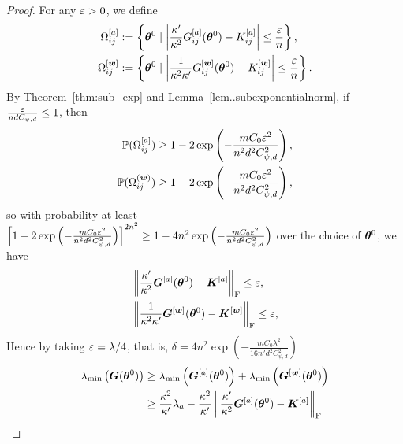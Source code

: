\documentclass[twoside,11pt]{article}
\begin{document}
\begin{proof}
    For any $\varepsilon > 0$, we define
    \begin{equation*}
        \begin{aligned}
            \Omega_{ij}^{[a]}   & :=\left\{\bm{\theta}^0 \mid \left\lvert \frac{\kappa'}{\kappa^2}G^{[a]}_{ij}(\bm{\theta}^0) - K^{[a]}_{ij}\right\rvert \leq \frac{\varepsilon}{n} \right\},       \\
            \Omega_{ij}^{[\bm{w}]} & := \left\{\bm{\theta}^0 \mid \left\lvert \frac{1}{\kappa^2\kappa'}G^{[\bm{w}]}_{ij}(\bm{\theta}^0) - K^{[\bm{w}]}_{ij}\right\rvert \leq \frac{\varepsilon}{n} \right\}.
        \end{aligned}
    \end{equation*}
    By Theorem~\ref{thm:sub_exp} and Lemma~\ref{lem..subexponentialnorm}, if $\frac{\varepsilon}{ndC_{\psi,d}}\leq 1$, then
    \begin{equation*}
        \begin{aligned}
            \mathbb{P}(\Omega^{[a]}_{ij})   & \geq 1-2\exp\left(-\frac{mC_0\varepsilon^2}{n^2d^2C_{\psi,d}^2}\right), \\
            \mathbb{P}(\Omega^{(\bm{w})}_{ij}) & \geq 1-2\exp\left(-\frac{mC_0\varepsilon^2}{n^2d^2C_{\psi,d}^2}\right),
        \end{aligned}
    \end{equation*}
    so with probability at least $\left[1-2\exp\left(-\frac{mC_0\varepsilon^2}{n^2d^2C_{\psi,d}^2}\right)\right]^{2n^2} \geq 1-4n^2\exp\left(-\frac{mC_0\varepsilon^2}{n^2d^2C_{\psi,d}^2}\right)$ over the choice of $\bm{\theta}^0$, we have
    \begin{equation*}
        \begin{aligned}
             & \left\lVert\frac{\kappa'}{\kappa^2}\bm{G}^{[a]}(\bm{\theta}^0) - \bm{K}^{[a]}\right\rVert_\mathrm{F} \leq \varepsilon,      \\
             & \left\lVert\frac{1}{\kappa^2\kappa'}\bm{G}^{[\bm{w}]}(\bm{\theta}^0) - \bm{K}^{[\bm{w}]}\right\rVert_\mathrm{F} \leq \varepsilon,
        \end{aligned}
    \end{equation*}
    Hence by taking $\varepsilon=\lambda/4$, that is, $\delta=4n^2\exp\left(-\frac{mC_0\lambda^2}{16n^2d^2C_{\psi,d}^2}\right)$
    \begin{equation*}
        \begin{aligned}
            \lambda_{\min}\left(\mG(\vtheta^0)\right)
             & \geq\lambda_{\min}\left(\mG^{[a]}(\vtheta^0)\right) + \lambda_{\min}\left(\mG^{[\vw]}(\vtheta^0)\right)                                   \\
             & \geq\frac{\kappa^2}{\kappa'}\lambda_a-\frac{\kappa^2}{\kappa'} \Norm{\frac{\kappa'}{\kappa^2}\mG^{[a]}(\vtheta^0) - \mK^{[a]}}_\mathrm{F} \\

\end{aligned}
\end{equation*}
\end{proof}
\end{document}
